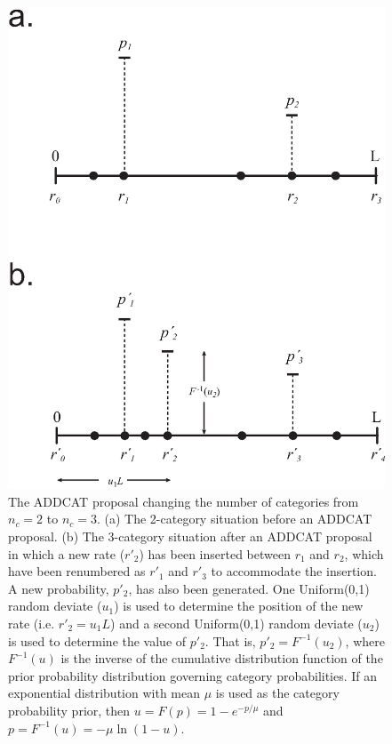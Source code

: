 \documentclass[12pt]{article}
\newcommand{\ncat}{n_c}
\begin{document}
%
%
\begin{figure}
\centering
\hfil\includegraphics[scale=0.7]{addcat.eps}\hfil
\caption{The ADDCAT proposal changing the number of categories from $\ncat = 2$ to $\ncat = 3$. (a) The 2-category situation before an ADDCAT proposal. (b) The 3-category situation after an ADDCAT proposal in which a new rate ($r'_2$) has been inserted between $r_1$ and $r_2$, which have been renumbered as $r'_1$ and $r'_3$ to accommodate the insertion. A new probability, $p'_2$, has also been generated. One Uniform(0,1) random deviate ($u_1$) is used to determine the position of the new rate (i.e. $r'_2 = u_1 L$) and a second Uniform(0,1) random deviate ($u_2$) is used to determine the value of $p'_2$. That is, $p'_2 = F^{-1}(u_2)$, where $F^{-1}(u)$ is the inverse of the cumulative distribution function of the prior probability distribution governing category probabilities. If an exponential distribution with mean $\mu$ is used as the category probability prior, then $u = F(p) = 1 - e^{-p/\mu}$ and $p = F^{-1}(u) = -\mu \ln (1 - u)$.}
\label{addcat}
\end{figure}
\end{document}
